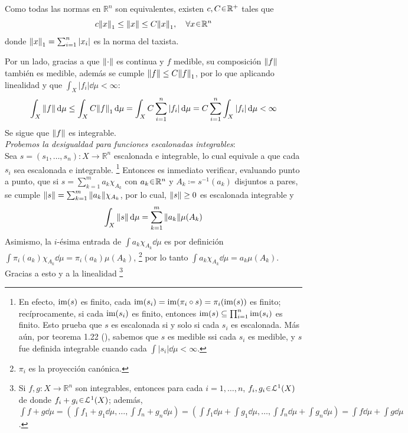\begin{sol}
Como todas las normas en $\mathbb{R}^n$ son equivalentes, existen $c,C\en\mathbb{R}^+$ tales que 
\[
c\norm{x}_{1} \leq \norm{x} \leq C\norm{x}_1,
\quad\forall x\en\mathbb{R}^n
\]
donde $\norm{x}_1 = \sum^n_{i=1}|x_i|$ es la norma del taxista.\par
Por un lado, gracias a que $\norm{\cdot}$ es continua y $f$ medible, su composición $\norm{f}$ también es medible, además se cumple $\norm{f} \leq C\norm{f}_1$, por lo que aplicando linealidad y que $\int_X |f_i| \dd{\mu} < \infty$:
\[
\int_X \norm{f} \dd{\mu}
\le \int_X C\norm{f}_1 \dd{\mu}
= \int_X C\sum^n_{i=1}|f_i| \dd{\mu} 
= C\sum^n_{i=1} \int_X |f_i| \dd{\mu} < \infty
\]
Se sigue que $\norm{f}$ es integrable.
\medskip\\
\emph{Probemos la desigualdad para funciones escalonadas integrables}:\\
Sea $s = (s_1,\dots,s_n) \colon X \to \mathbb{R}^n$ escalonada e integrable, lo cual equivale a que cada $s_i$ sea escalonada e integrable.%
\footnote{
    En efecto, $\operatorname{im}(s)$ es finito, cada $\operatorname{im}(s_i) = \operatorname{im}(\pi_i\circ s) = \pi_i(\operatorname{im}(s))$ es finito; recíprocamente, si cada $\operatorname{im}(s_i)$ es finito, entonces $\operatorname{im}(s) \subseteq \prod^n_{i=1}\operatorname{im}(s_i)$ es finito. Esto prueba que $s$ es escalonada si y solo si cada $s_i$ es escalonada. Más aún, por teorema 1.22 (\cite[\S 1.2]{Salamon}), sabemos que $s$ es medible ssi cada $s_i$ es medible, y $s$ fue definida integrable cuando cada $\int |s_i|\dd{\mu}<\infty$. 
}
Entonces es inmediato verificar, evaluando punto a punto, que si $s = \sum^m_{k=1} a_k\chi_{A_k}$ con $a_k\en\mathbb{R}^n$ y $A_k \coloneq s^{-1}(a_k)$ disjuntos a pares, se cumple $\norm{s} = \sum^m_{k=1}\norm{a_k}\chi_{A_k}$, por lo cual, $\norm{s} \ge0$ es escalonada integrable y
\begin{equation}\label{eq:intnorm}
\int_X \norm{s} \dd{\mu} = \sum^m_{k=1}\norm{a_k}\mu(A_k)
\end{equation}
Asimismo, la $i$-ésima entrada de $\int a_k\chi_{A_k}\dd{\mu}$ es por definición $\int\pi_i(a_k)\chi_{A_k}\dd{\mu} = \pi_i(a_k)\mu({A_k})$,%
\footnote{
    $\pi_i$ es la proyección canónica.
}
por lo tanto $\int a_k\chi_{A_k}\dd{\mu} = a_k\mu(A_k)$. Gracias a esto y a la linealidad%
\footnote{
    Si $f,g \colon X \to \mathbb{R}^n$ son integrables, entonces para cada $i=1,\dots,n$, $f_i,g_i\en\mathcal{L}^1(X)$ de donde $f_i+g_i\en\mathcal{L}^1(X)$; además, $\int f+g \dd{\mu} = \left(\int f_1+g_1 \dd{\mu},\dots,\int f_n+g_n \dd{\mu}\right) = \left(\int f_1\dd{\mu}+\int g_1 \dd{\mu},\dots,\int f_n\dd{\mu}+\int g_n \dd{\mu}\right) = \int f\dd{\mu} + \int g\dd{\mu}$.
}
\end{sol}
